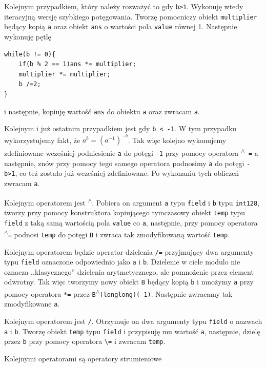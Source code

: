 \documentclass{article}
\begin{document}
Kolejnym przypadkiem, który należy rozważyć to gdy \texttt{b>1}. Wykonuję wtedy iteracyjną wersję szybkiego potęgowania.
Tworzę pomocniczy obiekt \texttt{multiplier} będący kopią \texttt{a} oraz obiekt \texttt{ans} o
wartości pola \texttt{value} równej 1. Następnie wykonuję pętlę
\begin{lstlisting}
while(b != 0){
    if(b % 2 == 1)ans *= multiplier;
    multiplier *= multiplier;
    b /=2;
}
\end{lstlisting}
i następnie, kopiuję wartość \texttt{ans} do obiektu \texttt{a} oraz zwracam \texttt{a}.

Kolejnym i już ostatnim przypadkiem jest gdy \texttt{b < -1}. W tym przypadku wykorzystujemy 
fakt, że $a^b=(a^{-1})^{-b}$. Tak więc kolejno wykonujemy zdefiniowane wcześniej 
podniesienie \texttt{a} do potęgi \texttt{-1} przy pomocy operatora \texttt{\textsuperscript{$\wedge$} =} 
a następnie, znów przy
pomocy tego samego operatora podnosimy \texttt{a} do potęgi \texttt{-b>1}, co też zostało już 
wcześniej zdefiniowane. Po wykonaniu tych obliczeń zwracam \texttt{a}.

Kolejnym operatorem jest \texttt{\textsuperscript{$\wedge$}}. Pobiera on argument \texttt{a} typu 
\texttt{field} i \texttt{b} typu 
\texttt{\textunderscore \textunderscore int128}, tworzy
przy pomocy konstruktora kopiującego tymczasowy obiekt \texttt{temp} typu \texttt{field} z taką 
samą wartością pola 
\texttt{value} co \texttt{a}, następnie, przy pomocy operatora 
\texttt{\textsuperscript{$\wedge$}=} podnosi 
\texttt{temp} do potęgi \texttt{B} i zwraca tak zmodyfikowaną wartość \texttt{temp}.

Kolejnym operatorem będzie operator dzielenia \texttt{/=} przyjmujący dwa argumenty typu 
\texttt{field} oznaczone odpowiednio jako \texttt{a} i \texttt{b}. Dzielenie w ciele modulo nie oznacza
,,klasycznego'' dzielenia arytmetycznego, ale pomnożenie przez element odwrotny. 
Tak więc tworzymy nowy obiekt \texttt{B} będący kopią \texttt{b} i mnożymy \texttt{a} przy pomocy
operatora \texttt{*=} przez \texttt{B\textsuperscript{$\wedge$}(long$ $long)(-1)}. Następnie zwracamy tak zmodyfikowane \texttt{a}.

Kolejnym operatorem jest \texttt{/}. Otrzymuje on dwa argumenty typu \texttt{field} o nazwach \texttt{a} i 
\texttt{b}. Tworzę obiekt \texttt{temp} typu \texttt{field} i przypisuję mu wartość \texttt{a}, następnie, dzielę przez \texttt{b} przy pomocy 
operatora \texttt{\textbackslash=} i zwracam \texttt{temp}.

Kolejnymi operatorami są operatory strumieniowe
\end{document}
